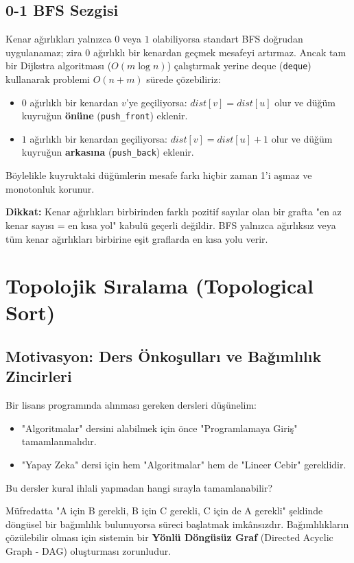 \subsection{0-1 BFS Sezgisi}
Kenar ağırlıkları yalnızca $0$ veya $1$ olabiliyorsa standart BFS doğrudan uygulanamaz; zira $0$ ağırlıklı bir kenardan geçmek mesafeyi artırmaz. Ancak tam bir Dijkstra algoritması ($O(m \log n)$) çalıştırmak yerine deque (\texttt{deque}) kullanarak problemi $O(n + m)$ sürede çözebiliriz:
\begin{itemize}
    \item $0$ ağırlıklı bir kenardan $v$'ye geçiliyorsa: $dist[v] = dist[u]$ olur ve düğüm kuyruğun \textbf{önüne} (\texttt{push\_front}) eklenir.
    \item $1$ ağırlıklı bir kenardan geçiliyorsa: $dist[v] = dist[u] + 1$ olur ve düğüm kuyruğun \textbf{arkasına} (\texttt{push\_back}) eklenir.
\end{itemize}
Böylelikle kuyruktaki düğümlerin mesafe farkı hiçbir zaman 1'i aşmaz ve monotonluk korunur.

\textbf{Dikkat:} Kenar ağırlıkları birbirinden farklı pozitif sayılar olan bir grafta "en az kenar sayısı = en kısa yol" kabulü geçerli değildir. BFS yalnızca ağırlıksız veya tüm kenar ağırlıkları birbirine eşit graflarda en kısa yolu verir.

\section{Topolojik Sıralama (Topological Sort)}

\subsection{Motivasyon: Ders Önkoşulları ve Bağımlılık Zincirleri}
Bir lisans programında alınması gereken dersleri düşünelim:
\begin{itemize}
    \item "Algoritmalar" dersini alabilmek için önce "Programlamaya Giriş" tamamlanmalıdır.
    \item "Yapay Zeka" dersi için hem "Algoritmalar" hem de "Lineer Cebir" gereklidir.
\end{itemize}
Bu dersler kural ihlali yapmadan hangi sırayla tamamlanabilir?

Müfredatta "A için B gerekli, B için C gerekli, C için de A gerekli" şeklinde döngüsel bir bağımlılık bulunuyorsa süreci başlatmak imkânsızdır. Bağımlılıkların çözülebilir olması için sistemin bir \textbf{Yönlü Döngüsüz Graf} (Directed Acyclic Graph - DAG) oluşturması zorunludur.


